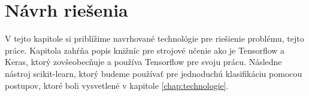 \chapter{Návrh riešenia}

V tejto kapitole si priblížime navrhované technológie pre riešienie problému, tejto práce.
Kapitola zahŕňa popis knižníc pre strojové učenie ako je Tensorflow a Keras, ktorý zovšeobecňuje a používa Tensorflow pre svoju prácu.
Následne nástroj scikit-learn, ktorý budeme používať pre jednoduchú klasifikáciu pomocou postupov, ktoré boli vysvetlené v kapitole \ref{chap:technologie}.





\begin{comment}

    \section{scikit-learn}
    \label{sec:scikitlearn}

    Scikit-learn je softvérová knižica pre strojové učenie pre programovací jazyk Python.
    Obsahuje množstvo algoritmov pre klasifikáciu, regresiu alebo zhlukovanie dát \cite{odkaz:scikitlearn}.
    Pre riešenie tejto práce obsahuje vhodné triedy, ktoré implementujú spomínané postupy zo sekcie \ref{sec:klasifikacia}.
    Príklady tried pre jednotlivé algoritmy:
    \begin{enumerate}
        \item[$\bullet$] \textbf{Nearest Neighbors} - scikit-learn poskytuje 2 rôzne klasifikátory pre algoritmus najbližsieho suseda.
        Trieda \textit{KNeighborsClassifier} klasifikuje na základe $k$ najbližšich susedov, kde $k$ je celé číslo špecifikované užívateľom.
        Druhá trieda \textit{RadiusNeighborsClassifier} implementuje klasifikáciu na základe počtu susedov v rámci pevného polomeru $r$ každého trénovacieho bodu,
        kde $r$ je hodnota s pohyblivou desatinou čiarkou určená užívateľom\footnote{\url{http://scikit-learn.org/stable/modules/neighbors.html\#nearest-neighbors-classification}}.
        \item[$\bullet$] \textbf{Support Vector Machines} - \textit{SVC}, \textit{NuSVC} a \textit{LinearSVC} sú triedy pre viac-triednu klasifikáciu.
        Pre ktoré je možné použit rôzne typy jadier[eng. kernels] \footnote{\url{http://scikit-learn.org/stable/modules/svm.html\#custom-kernels}}.
        \item[$\bullet$] \textbf{Stochastic Gradient Descent} - \textit{SGDClassifier} podporuje viac-triednu klasifikáciu pomocou kombinácie viacerých binárnych klasifikátorov v tzv.“one versus all” (OVA) schéme \footnote{\url{http://scikit-learn.org/stable/modules/sgd.html\#stochastic-gradient-descent}}.
    \end{enumerate}



\end{comment}
